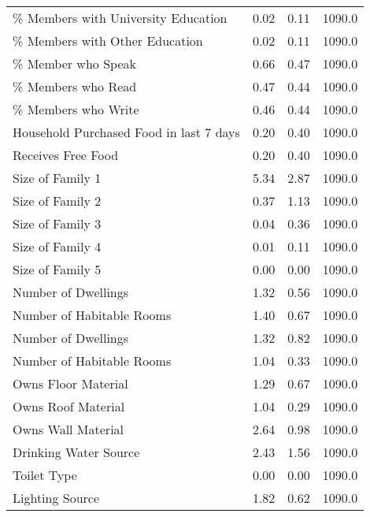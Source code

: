 \begin{longtable}{lrrr}
\% Members with University Education                &  0.02 &  0.11 &  1090.0 \\
\% Members with Other Education                     &  0.02 &  0.11 &  1090.0 \\
\% Member who Speak                                 &  0.66 &  0.47 &  1090.0 \\
\% Members who Read                                 &  0.47 &  0.44 &  1090.0 \\
\% Members who Write                                &  0.46 &  0.44 &  1090.0 \\
Household Purchased Food in last 7 days            &  0.20 &  0.40 &  1090.0 \\
Receives Free Food                                 &  0.20 &  0.40 &  1090.0 \\
Size of Family 1                                   &  5.34 &  2.87 &  1090.0 \\
Size of Family 2                                   &  0.37 &  1.13 &  1090.0 \\
Size of Family 3                                   &  0.04 &  0.36 &  1090.0 \\
Size of Family 4                                   &  0.01 &  0.11 &  1090.0 \\
Size of Family 5                                   &  0.00 &  0.00 &  1090.0 \\
Number of Dwellings                                &  1.32 &  0.56 &  1090.0 \\
Number of Habitable Rooms                          &  1.40 &  0.67 &  1090.0 \\
Number of Dwellings                                &  1.32 &  0.82 &  1090.0 \\
Number of Habitable Rooms                          &  1.04 &  0.33 &  1090.0 \\
Owns Floor Material                                &  1.29 &  0.67 &  1090.0 \\
Owns Roof Material                                 &  1.04 &  0.29 &  1090.0 \\
Owns Wall Material                                 &  2.64 &  0.98 &  1090.0 \\
Drinking Water Source                              &  2.43 &  1.56 &  1090.0 \\
Toilet Type                                        &  0.00 &  0.00 &  1090.0 \\
Lighting Source                                    &  1.82 &  0.62 &  1090.0 \\

\end{longtable}
